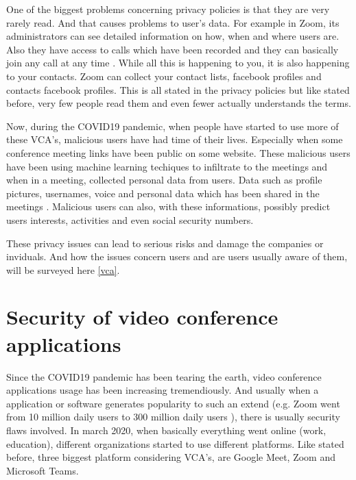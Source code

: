 \documentclass[utf8,english]{gradu3}
\begin{document}
One of the biggest problems concerning privacy policies is that they are very rarely read. And that causes problems to user's data. For example in Zoom, its administrators can see detailed information on how, when and where users are. Also they have access to calls which have been recorded and they can basically join any call at any time \parencite{Darkside}.
%
While all this is happening to you, it is also happening to your contacts. Zoom can collect your contact lists, facebook profiles and contacts facebook profiles. This is all stated in the privacy policies but like stated before, very few people read them and even fewer actually understands the terms.

Now, during the COVID19 pandemic, when people have started to use more of these VCA's, malicious users have had time of their lives. Especially when some conference meeting links have been public on some website. These malicious users have been using machine learning techiques to infiltrate to the meetings and when in a meeting, collected personal data from users. Data such as profile pictures, usernames, voice and personal data which has been shared in the meetings \parencite{zoomingInto}.
Malicious users can also, with these informations, possibly predict users interests, activities and even social security numbers.

These privacy issues can lead to serious risks and damage the companies or inviduals. And how the issues concern users and are users usually aware of them, will be surveyed here \ref{vca}.

\section{Security of video conference applications}
Since the COVID19 pandemic has been tearing the earth, video conference applications usage has been increasing tremendiously. And usually when a application or software generates popularity to such an extend (e.g. Zoom went from 10 million daily users to 300 million daily users \parencite{goneWrongZoom}), there is usually security flaws involved. 
In march 2020, when basically everything went online (work, education), different organizations started to use different platforms. Like stated before, three biggest platform considering VCA's, are Google Meet, Zoom and Microsoft Teams.
\end{document}
